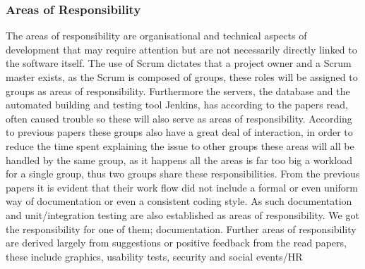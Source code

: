 \subsubsection*{Areas of Responsibility}
The areas of responsibility are organisational and technical aspects of development that may require attention but are not necessarily directly linked to the software itself.
The use of Scrum dictates that a project owner and a Scrum master exists, as the Scrum is composed of groups, these roles will be assigned to groups as areas of responsibility.
Furthermore the servers, the database and the automated building and testing tool Jenkins, has according to the papers read, often caused trouble so these will also serve as areas of responsibility. 
According to previous papers these groups also have a great deal of interaction, in order to reduce the time spent explaining the issue to other groups these areas will all be handled by the same group, as it happens all the areas is far too big a workload for a single group, thus two groups share these responsibilities.
From the previous papers it is evident that their work flow did not include a formal or even uniform way of documentation or even a consistent coding style.
As such documentation and unit/integration testing are also established as areas of responsibility.
We got the responsibility for one of them; documentation. 
Further areas of responsibility are derived largely from suggestions or positive feedback from the read papers, these include graphics, usability tests, security and social events/HR

